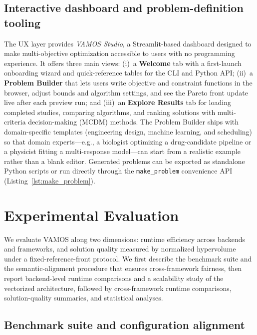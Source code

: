 \documentclass[journal]{IEEEtran}
\newcommand{\VAMOS}{VAMOS}
\begin{document}
\subsection{Interactive dashboard and problem-definition tooling}

The UX layer provides \emph{\VAMOS{} Studio}, a Streamlit-based dashboard designed to make multi-objective optimization accessible to users with no programming experience. It offers three main views: (i)~a \textbf{Welcome} tab with a first-launch onboarding wizard and quick-reference tables for the CLI and Python API; (ii)~a \textbf{Problem Builder} that lets users write objective and constraint functions in the browser, adjust bounds and algorithm settings, and see the Pareto front update live after each preview run; and (iii)~an \textbf{Explore Results} tab for loading completed studies, comparing algorithms, and ranking solutions with multi-criteria decision-making (MCDM) methods. The Problem Builder ships with domain-specific templates (engineering design, machine learning, and scheduling) so that domain experts---e.g., a biologist optimizing a drug-candidate pipeline or a physicist fitting a multi-response model---can start from a realistic example rather than a blank editor. Generated problems can be exported as standalone Python scripts or run directly through the \texttt{make\_problem} convenience API (Listing~\ref{lst:make_problem}).

\section{Experimental Evaluation}
\label{sec:experiments}

We evaluate \VAMOS{} along two dimensions: runtime efficiency across backends and frameworks, and solution quality measured by normalized hypervolume under a fixed-reference-front protocol. We first describe the benchmark suite and the semantic-alignment procedure that ensures cross-framework fairness, then report backend-level runtime comparisons and a scalability study of the vectorized architecture, followed by cross-framework runtime comparisons, solution-quality summaries, and statistical analyses.

\subsection{Benchmark suite and configuration alignment}
\end{document}
